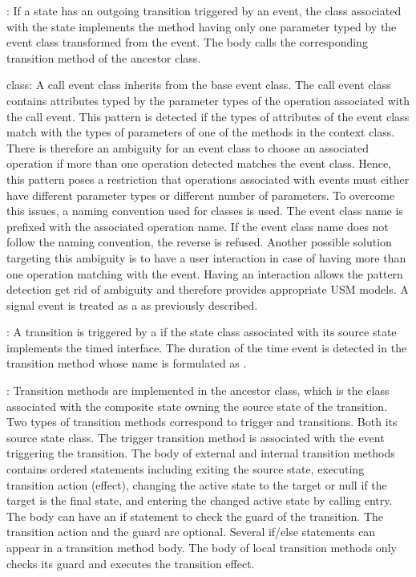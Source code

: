 
\noindent
{}: If a state has an outgoing transition triggered by an event, the class associated with the state implements the  method having only one parameter typed by the event class transformed from the event. 
The body calls the corresponding transition method of the ancestor class.

\noindent
{} class: A call event class inherits from the base event class. 
The call event class contains attributes typed by the parameter types of the operation associated with the call event. 
This pattern is detected if the types of attributes of the event class match with the types of parameters of one of the methods in the context class. 
There is therefore an ambiguity for an event class to choose an associated operation if more than one operation detected matches the event class. 
Hence, this pattern poses a restriction that operations associated with events must either have different parameter types or different number of parameters. 
To overcome this issues, a naming convention used for  classes is used. 
The event class name is prefixed with the associated operation name. 
If the event class name does not follow the naming convention, the reverse is refused. 
Another possible solution targeting this ambiguity is to have a user interaction in case of having more than one operation matching with the event. 
Having an interaction allows the pattern detection get rid of ambiguity and therefore provides appropriate USM models. 
A signal event is treated as a  as previously described.

\noindent
{}: A transition is triggered by a  if the state class associated with its source state implements the timed interface. 
The duration of the time event is detected in the transition method whose name is formulated as . 

\noindent
{}: Transition methods are implemented in the ancestor class, which is the class associated with the composite state owning the source state of the transition. 
Two types of transition methods correspond to trigger and  transitions. 
Both  its source state class. 
The trigger transition method is associated with the event triggering the transition. 
The body of external and internal transition methods contains ordered statements including exiting the source state, executing transition action (effect), changing the active state to the target or null if the target is the final state, and entering the changed active state by calling entry. 
The body can have an if statement to check the guard of the transition. 
The transition action and the guard are optional. 
Several if/else statements can appear in a  transition method body. 
The body of local transition methods only checks its guard and executes the transition effect.

